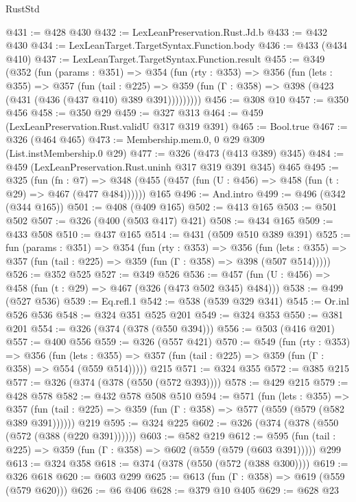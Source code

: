 \begin{lexlean}{RustStd}
\begin{coremodule}
@431 := @428 @430
@432 := LexLeanPreservation.Rust.Jd.b
@433 := @432 @430
@434 := LexLeanTarget.TargetSyntax.Function.body
@436 := @433 (@434 @410)
@437 := LexLeanTarget.TargetSyntax.Function.result
@455 := @349
    (@352
      (fun (params : @351) =>
      @354
        (fun (rty : @353) =>
        @356
          (fun (lets : @355) =>
          @357
            (fun (tail : @225) =>
            @359 (fun (Γ : @358) => @398 (@423 (@431 (@436 (@437 @410) @389 @391)))))))))
@456 := @308 @10
@457 := @350 @456
@458 := @350 @29
@459 := @327 @313
@464 := @459 (LexLeanPreservation.Rust.validU @317 @319 @391)
@465 := Bool.true
@467 := @326 (@464 @465)
@473 := Membership.mem.{0, 0} @29 @309 (List.instMembership.{0} @29)
@477 := @326 (@473 (@413 @389) @345)
@484 := @459 (LexLeanPreservation.Rust.uninh @317 @319 @391 @345) @465
@495 := @325
    (fun (fn : @7) =>
    @348 (@455 (@457 (fun (U : @456) => @458 (fun (t : @29) => @467 (@477 @484))))))
    @165
@496 := And.intro
@499 := @496 (@342 (@344 @165))
@501 := @408 (@409 @165)
@502 := @413 @165
@503 := @501 @502
@507 := @326 (@400 (@503 @417) @421)
@508 := @434 @165
@509 := @433 @508
@510 := @437 @165
@514 := @431 (@509 @510 @389 @391)
@525 := fun (params : @351) =>
  @354
    (fun (rty : @353) =>
    @356
      (fun (lets : @355) => @357 (fun (tail : @225) => @359 (fun (Γ : @358) => @398 (@507 @514)))))
@526 := @352 @525
@527 := @349 @526
@536 := @457 (fun (U : @456) => @458 (fun (t : @29) => @467 (@326 (@473 @502 @345) @484)))
@538 := @499 (@527 @536)
@539 := Eq.refl.{1}
@542 := @538 (@539 @329 @341)
@545 := Or.inl @526 @536
@548 := @324 @351 @525 @201
@549 := @324 @353
@550 := @381 @201
@554 := @326 (@374 (@378 (@550 @394)))
@556 := @503 (@416 @201)
@557 := @400 @556
@559 := @326 (@557 @421)
@570 := @549
    (fun (rty : @353) =>
    @356
      (fun (lets : @355) => @357 (fun (tail : @225) => @359 (fun (Γ : @358) => @554 (@559 @514)))))
    @215
@571 := @324 @355
@572 := @385 @215
@577 := @326 (@374 (@378 (@550 (@572 @393))))
@578 := @429 @215
@579 := @428 @578
@582 := @432 @578 @508 @510
@594 := @571
    (fun (lets : @355) =>
    @357 (fun (tail : @225) => @359 (fun (Γ : @358) => @577 (@559 (@579 (@582 @389 @391))))))
    @219
@595 := @324 @225
@602 := @326 (@374 (@378 (@550 (@572 (@388 (@220 @391))))))
@603 := @582 @219
@612 := @595 (fun (tail : @225) => @359 (fun (Γ : @358) => @602 (@559 (@579 (@603 @391))))) @299
@613 := @324 @358
@618 := @374 (@378 (@550 (@572 (@388 @300))))
@619 := @326 @618
@620 := @603 @299
@625 := @613 (fun (Γ : @358) => @619 (@559 (@579 @620)))
@626 := @6 @406
@628 := @379 @10 @405
@629 := @628 @23

\end{coremodule}
\end{lexlean}
